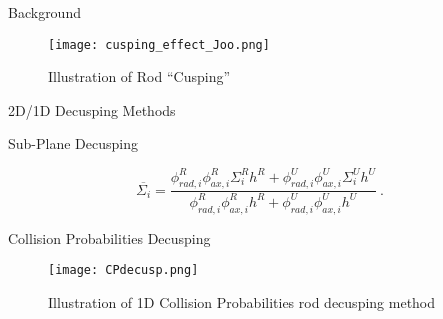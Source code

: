 \begin{frame}[t]{Background}

\begin{figure}[h]
  \centering
  \texttt{[image: cusping\_effect\_Joo.png]}
  \caption[Rod Cusping Illustration]{Illustration of Rod ``Cusping'' \cite{ICAPPcontrolRodDecuspingNTRACER}}\label{f:cuspingEffectJoo}
\end{figure} 
    
\end{frame}


\begin{frame}[t]{2D/1D Decusping Methods}
    
    
    
\end{frame}


\begin{frame}[t]{Sub-Plane Decusping}
    
    \begin{equation}\label{e:nTRACERdecusping}
    \overline{\Sigma_i} = \frac{\phi_{rad,i}^R \phi_{ax,i}^R \Sigma_i^R h^R + \phi_{rad,i}^U \phi_{ax,i}^U \Sigma_i^U h^U}{\phi_{rad,i}^R \phi_{ax,i}^R h^R + \phi_{rad,i}^U \phi_{ax,i}^U h^U}\ .
    \end{equation}
    
\end{frame}


\begin{frame}[t]{Collision Probabilities Decusping}
    
    \begin{figure}[h]
      \centering
      \texttt{[image: CPdecusp.png]}
      \caption[Collision Probabilities Decusping]{Illustration of 1D Collision Probabilities rod decusping method}\label{f:CPdecusp}
    \end{figure}
    
\end{frame}